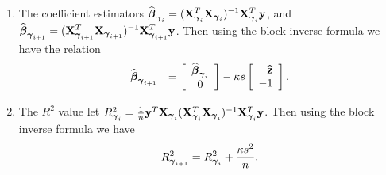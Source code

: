 {\begin{enumerate}
	\item
	The coefficient estimators 
	$ 
	\displaystyle \widehat{{\boldsymbol \beta}}_{{\boldsymbol \gamma}_{i}} = ({\bf X}_{{\boldsymbol \gamma}_{i}}^T{\bf X}_{{\boldsymbol \gamma}_{i}})^{-1}{\bf X}_{{\boldsymbol \gamma}_{i}}^T{\bf y}$,
	and $\displaystyle \widehat{{\boldsymbol \beta}}_{{\boldsymbol \gamma}_{i+1}}  = ({\bf X}_{{\boldsymbol \gamma}_{i+1}}^T{\bf X}_{{\boldsymbol \gamma}_{i+1}})^{-1}{\bf X}_{{\boldsymbol \gamma}_{i+1}}^T{\bf y}$.  
	Then using the block inverse formula we have
	the relation
	$$
	\begin{array}{rl}
	\displaystyle \widehat{{\boldsymbol \beta}}_{{\boldsymbol \gamma}_{i+1}}
	& \displaystyle 
	= \left[ \begin{array}{c}
	\widehat{{\boldsymbol \beta}}_{{\boldsymbol \gamma}_{i}} \\
	0 
	\end{array} \right] - \kappa s  \left[ \begin{array}{r}
	\widehat{{\bf z}}   \\
	- 1
	\end{array} \right].
	\end{array} 
	$$
	
	\item The $R^2$ value let 
	$R_{\vgamma_{i}}^2 = \tfrac{1}{n} \vy^T\mX_{\vgamma_{i}}(\mX_{\vgamma_{i}}^T\mX_{\vgamma_{i}})^{-1}\mX_{\vgamma_{i}}^T\vy$.
	Then using the block inverse formula we have
	$$
	\begin{array}{rl}
	\ds 
	R_{\vgamma_{i+1}}^2 
	= R_{\vgamma_{i}}^2
	+ \frac{\kappa s^2}{n}.
	
	\end{array}
	$$
	
\end{enumerate}

}
